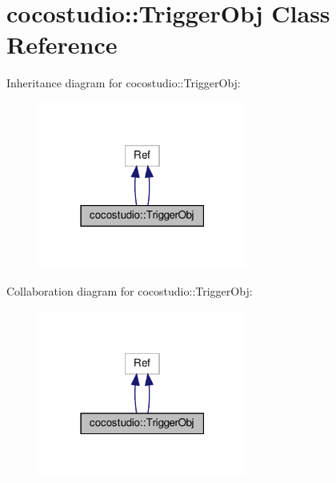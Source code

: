 \hypertarget{classcocostudio_1_1TriggerObj}{}\section{cocostudio\+:\+:Trigger\+Obj Class Reference}
\label{classcocostudio_1_1TriggerObj}


Inheritance diagram for cocostudio\+:\+:Trigger\+Obj\+:
\nopagebreak
\begin{figure}[H]
\begin{center}
\leavevmode
\includegraphics[width=195pt]{classcocostudio_1_1TriggerObj__inherit__graph}
\end{center}
\end{figure}


Collaboration diagram for cocostudio\+:\+:Trigger\+Obj\+:
\nopagebreak
\begin{figure}[H]
\begin{center}
\leavevmode
\includegraphics[width=195pt]{classcocostudio_1_1TriggerObj__coll__graph}
\end{center}
\end{figure}
